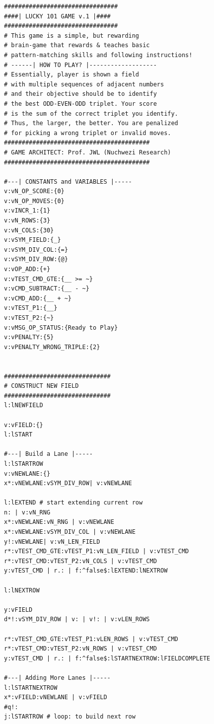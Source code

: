 \documentclass[a4paper, 18pt]{book} %
\begin{document}
{
 \small
  \begin{tcolorbox}[teaterminalstyle, title=TEA Program: LUCKY 101 v1, breakable]
  \begin{lstlisting}[language=TEA,breaklines=true,]
################################
####| LUCKY 101 GAME v.1 |####
################################
# This game is a simple, but rewarding 
# brain-game that rewards & teaches basic 
# pattern-matching skills and following instructions!
# ------| HOW TO PLAY? |-------------------
# Essentially, player is shown a field
# with multiple sequences of adjacent numbers
# and their objective should be to identify
# the best ODD-EVEN-ODD triplet. Your score
# is the sum of the correct triplet you identify.
# Thus, the larger, the better. You are penalized
# for picking a wrong triplet or invalid moves.
#########################################
# GAME ARCHITECT: Prof. JWL (Nuchwezi Research)
#########################################

#---| CONSTANTS and VARIABLES |-----
v:vN_OP_SCORE:{0}
v:vN_OP_MOVES:{0}
v:vINCR_1:{1}
v:vN_ROWS:{3}
v:vN_COLS:{30}
v:vSYM_FIELD:{_}
v:vSYM_DIV_COL:{=}
v:vSYM_DIV_ROW:{@}
v:vOP_ADD:{+}
v:vTEST_CMD_GTE:{__ >= ~}
v:vCMD_SUBTRACT:{__ - ~}
v:vCMD_ADD:{__ + ~}
v:vTEST_P1:{__}
v:vTEST_P2:{~}
v:vMSG_OP_STATUS:{Ready to Play}
v:vPENALTY:{5}
v:vPENALTY_WRONG_TRIPLE:{2}


##############################
# CONSTRUCT NEW FIELD
##############################
l:lNEWFIELD

v:vFIELD:{}
l:lSTART

#---| Build a Lane |-----
l:lSTARTROW
v:vNEWLANE:{}
x*:vNEWLANE:vSYM_DIV_ROW| v:vNEWLANE

l:lEXTEND # start extending current row
n: | v:vN_RNG
x*:vNEWLANE:vN_RNG | v:vNEWLANE
x*:vNEWLANE:vSYM_DIV_COL | v:vNEWLANE
y!:vNEWLANE| v:vN_LEN_FIELD
r*:vTEST_CMD_GTE:vTEST_P1:vN_LEN_FIELD | v:vTEST_CMD
r*:vTEST_CMD:vTEST_P2:vN_COLS | v:vTEST_CMD
y:vTEST_CMD | r.: | f:^false$:lEXTEND:lNEXTROW

l:lNEXTROW

y:vFIELD
d*!:vSYM_DIV_ROW | v: | v!: | v:vLEN_ROWS

r*:vTEST_CMD_GTE:vTEST_P1:vLEN_ROWS | v:vTEST_CMD
r*:vTEST_CMD:vTEST_P2:vN_ROWS | v:vTEST_CMD
y:vTEST_CMD | r.: | f:^false$:lSTARTNEXTROW:lFIELDCOMPLETE

#---| Adding More Lanes |-----
l:lSTARTNEXTROW
x*:vFIELD:vNEWLANE | v:vFIELD
#q!:
j:lSTARTROW # loop: to build next row


\end{lstlisting}
\end{tcolorbox}}
\end{document}
